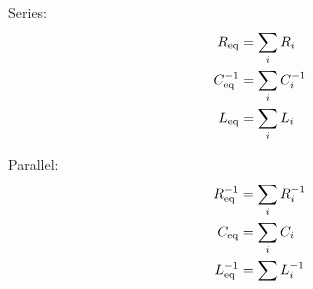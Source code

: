 

\vspace*{\fill}
\centering

Series:
\begin{align*}
    R_{\rm eq} &= \sum_{i} R_{i} \\
    C_{\rm eq}^{-1} &= \sum_{i} C_{i}^{-1} \\
    L_{\rm eq} &= \sum_{i} L_{i}
\end{align*}

Parallel:
\begin{align*}
    R_{\rm eq}^{-1} &= \sum_{i} R_{i}^{-1} \\
    C_{\rm eq} &= \sum_{i} C_{i} \\
    L_{\rm eq}^{-1} &= \sum L_{i}^{-1}
\end{align*}

\centering
\vspace*{\fill}

